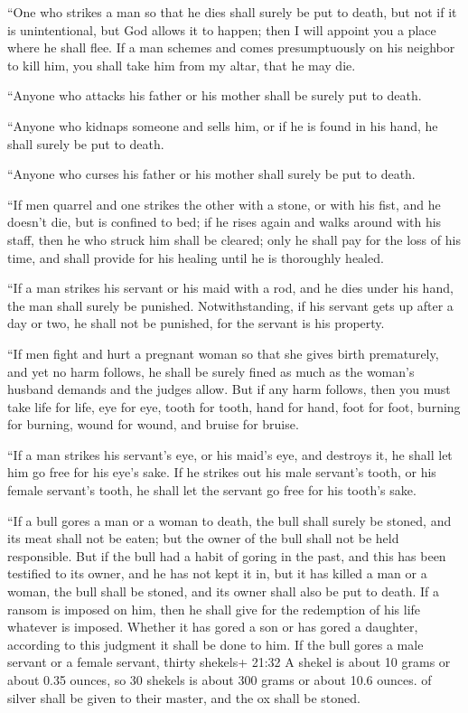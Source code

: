  ``One who strikes a man so that he dies shall surely be
put to death,  but not if it is unintentional, but God
allows it to happen; then I will appoint you a place where he shall
flee.  If a man schemes and comes presumptuously on his
neighbor to kill him, you shall take him from my altar, that he may die.

 ``Anyone who attacks his father or his mother shall be
surely put to death.

 ``Anyone who kidnaps someone and sells him, or if he is
found in his hand, he shall surely be put to death.

 ``Anyone who curses his father or his mother shall surely
be put to death.

 ``If men quarrel and one strikes the other with a stone,
or with his fist, and he doesn't die, but is confined to bed;
 if he rises again and walks around with his staff, then he
who struck him shall be cleared; only he shall pay for the loss of his
time, and shall provide for his healing until he is thoroughly healed.

 ``If a man strikes his servant or his maid with a rod, and
he dies under his hand, the man shall surely be punished. 
Notwithstanding, if his servant gets up after a day or two, he shall not
be punished, for the servant is his property.

 ``If men fight and hurt a pregnant woman so that she gives
birth prematurely, and yet no harm follows, he shall be surely fined as
much as the woman's husband demands and the judges allow. 
But if any harm follows, then you must take life for life, 
eye for eye, tooth for tooth, hand for hand, foot for foot,
 burning for burning, wound for wound, and bruise for
bruise.

 ``If a man strikes his servant's eye, or his maid's eye,
and destroys it, he shall let him go free for his eye's sake.
 If he strikes out his male servant's tooth, or his female
servant's tooth, he shall let the servant go free for his tooth's sake.

 ``If a bull gores a man or a woman to death, the bull
shall surely be stoned, and its meat shall not be eaten; but the owner
of the bull shall not be held responsible.  But if the bull
had a habit of goring in the past, and this has been testified to its
owner, and he has not kept it in, but it has killed a man or a woman,
the bull shall be stoned, and its owner shall also be put to death.
 If a ransom is imposed on him, then he shall give for the
redemption of his life whatever is imposed.  Whether it has
gored a son or has gored a daughter, according to this judgment it shall
be done to him.  If the bull gores a male servant or a
female servant, thirty shekels+ 21:32 A shekel is about 10 grams or
about 0.35 ounces, so 30 shekels is about 300 grams or about 10.6
ounces. of silver shall be given to their master, and the ox shall be
stoned.

